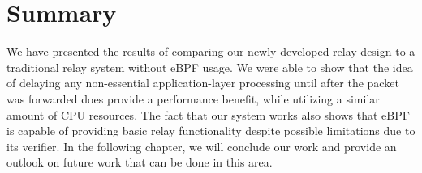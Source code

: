 \section{Summary}\label{sec:summary_ch4}

We have presented the results of comparing our newly developed 
relay design to a traditional relay system without eBPF usage.
We were able to show that the idea of delaying any non-essential
application-layer processing until after the packet was forwarded
does provide a performance benefit, while utilizing a similar 
amount of CPU resources.
The fact that our system works also shows that eBPF is capable of 
providing basic relay functionality despite possible limitations
due to its verifier.
In the following chapter, we will conclude our work and provide
an outlook on future work that can be done in this area.